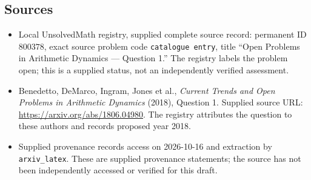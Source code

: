 \documentclass[11pt]{article}
\begin{document}
\subsection{Sources}
\begin{itemize}
\item Local UnsolvedMath registry, supplied complete source record: permanent ID \(800378\), exact source problem code \texttt{catalogue entry}, title ``Open Problems in Arithmetic Dynamics --- Question 1.'' The registry labels the problem open; this is a supplied status, not an independently verified assessment.
\item Benedetto, DeMarco, Ingram, Jones et al., \emph{Current Trends and Open Problems in Arithmetic Dynamics} (2018), Question 1. Supplied source URL: \url{https://arxiv.org/abs/1806.04980}. The registry attributes the question to these authors and records proposed year 2018.
\item Supplied provenance records access on 2026-10-16 and extraction by \texttt{arxiv\_latex}. These are supplied provenance statements; the source has not been independently accessed or verified for this draft.
\end{itemize}
\end{document}
